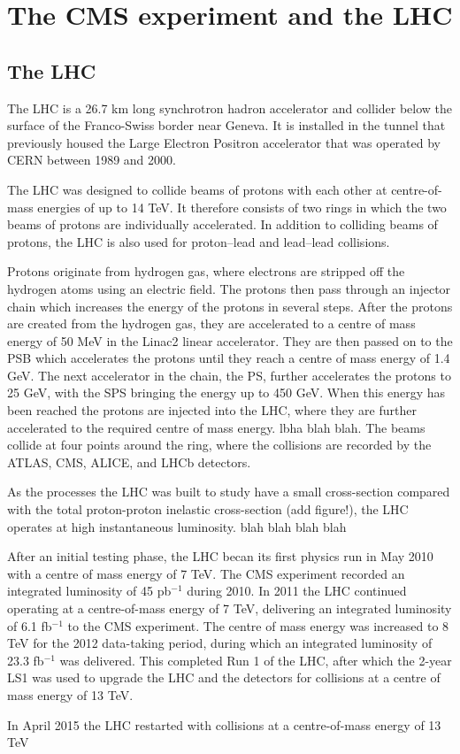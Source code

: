 \chapter{The \acs{CMS} experiment and the \acs{LHC}}
\label{chap:CMSLHC}

\section{The \acs{LHC}}
\label{sec:CMSLHC_LHC}

The \acf{LHC} \cite{lhc-machine}  is a 26.7 km long synchrotron hadron accelerator and collider below the surface of the 
Franco-Swiss border near Geneva. It
is installed in the tunnel that previously housed the Large Electron Positron accelerator
that was operated by \acf{CERN} between 1989 and 2000.

The \ac{LHC} was designed to collide beams of protons with each other at centre-of-mass
energies of up to 14 TeV. It therefore consists of two rings in which the two beams
of protons are individually accelerated. In addition to colliding beams of protons, the \ac{LHC}
is also used for proton--lead and lead--lead collisions.

Protons originate from hydrogen gas, where electrons are stripped off the 
hydrogen atoms using an electric field. The protons then pass through an injector
chain which increases the energy of the protons in several steps. After the protons
are created from the hydrogen gas, they are accelerated to a centre of mass energy of
50 MeV in the Linac2 linear accelerator. They are then passed on to the
\acf{PSB} which accelerates the protons until they reach a centre of mass energy of 1.4 GeV.
The next accelerator in the chain, the \acf{PS}, further accelerates the protons to 25 GeV,
with the \acf{SPS} bringing the energy up to 450 GeV. When this energy has been 
reached the protons are injected into the \ac{LHC}, where they are further accelerated to 
the required centre of mass energy. lbha blah blah. The beams collide at four points
around the ring, where the collisions are recorded by the ATLAS, CMS, ALICE, and LHCb detectors.

As the processes the \ac{LHC} was built to study have a small cross-section
compared with the total proton-proton inelastic cross-section (add figure!), the
LHC operates at high instantaneous luminosity. blah blah blah blah

After an initial testing phase, the \ac{LHC} becan its first physics run in May 2010 with 
a centre of mass energy of 7 TeV. The CMS experiment recorded an integrated luminosity of 45 pb$^{-1}$
during 2010. In 2011 the \ac{LHC} continued operating at a centre-of-mass energy of 7 TeV, delivering an integrated 
luminosity of 6.1 fb$^{-1}$ to the CMS experiment. The centre of mass energy was increased to 8 TeV
for the 2012 data-taking period, during which an integrated luminosity of 23.3 fb$^{-1}$ was delivered.
This completed Run 1 of the \ac{LHC}, after which the 2-year \ac{LS1} was used to 
upgrade the LHC and the detectors for collisions at a centre of mass energy of 13 TeV.

In April 2015 the \ac{LHC} restarted with collisions at a centre-of-mass energy of 13 TeV





